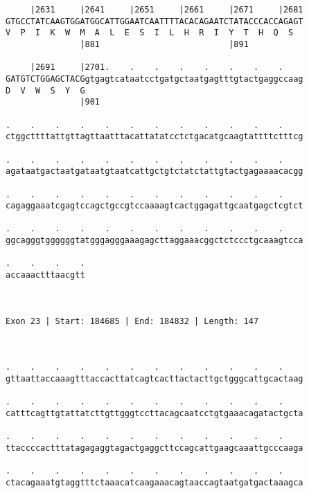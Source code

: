 \documentclass{article}
\begin{document}
\begin{Verbatim}
     |2631     |2641     |2651     |2661     |2671     |2681
GTGCCTATCAAGTGGATGGCATTGGAATCAATTTTACACAGAATCTATACCCACCAGAGT
V  P  I  K  W  M  A  L  E  S  I  L  H  R  I  Y  T  H  Q  S  
               |881                          |891           
  
     |2691     |2701.    .    .    .    .    .    .    .    
GATGTCTGGAGCTACGgtgagtcataatcctgatgctaatgagtttgtactgaggccaag
D  V  W  S  Y  G                                            
               |901                                         
  
.    .    .    .    .    .    .    .    .    .    .    .    
ctggcttttattgttagttaatttacattatatcctctgacatgcaagtattttctttcg
                                                            
.    .    .    .    .    .    .    .    .    .    .    .    
agataatgactaatgataatgtaatcattgctgtctatctattgtactgagaaaacacgg
                                                            
.    .    .    .    .    .    .    .    .    .    .    .    
cagaggaaatcgagtccagctgccgtccaaaagtcactggagattgcaatgagctcgtct
                                                            
.    .    .    .    .    .    .    .    .    .    .    .    
ggcagggtggggggtatgggagggaaagagcttaggaaacggctctccctgcaaagtcca
                                                            
.    .    .    .
accaaactttaacgtt
                
                
 
Exon 23 | Start: 184685 | End: 184832 | Length: 147



.    .    .    .    .    .    .    .    .    .    .    .    
gttaattaccaaagtttaccacttatcagtcacttactacttgctgggcattgcactaag
                                                            
.    .    .    .    .    .    .    .    .    .    .    .    
catttcagttgtattatcttgttgggtccttacagcaatcctgtgaaacagatactgcta
                                                            
.    .    .    .    .    .    .    .    .    .    .    .    
ttaccccactttatagagaggtagactgaggcttccagcattgaagcaaattgcccaaga
                                                            
.    .    .    .    .    .    .    .    .    .    .    .    
ctacagaaatgtaggtttctaaacatcaagaaacagtaaccagtaatgatgactaaagca
                                                            

\end{Verbatim}
\end{document}
